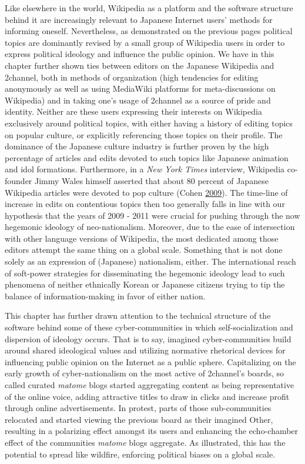 \documentclass[10pt,british,A4paper,twoside]{memoir}
\begin{document}
Like elsewhere in the world, Wikipedia as a platform and the software
structure behind it are increasingly relevant to Japanese Internet
users' methods for informing oneself. Nevertheless, as demonstrated on
the previous pages political topics are dominantly revised by a small
group of Wikipedia users in order to express political ideology and
influence the public opinion. We have in this chapter further shown ties
between editors on the Japanese Wikipedia and 2channel, both in methods
of organization (high tendencies for editing anonymously as well as
using MediaWiki platforms for meta-discussions on Wikipedia) and in
taking one's usage of 2channel as a source of pride and identity.
Neither are these users expressing their interests on Wikipedia
exclusively around political topics, with either having a history
of editing topics on popular culture, or explicitly referencing those
topics on their profile. The dominance of the Japanese culture industry
is further proven by the high percentage of articles and edits devoted
to such topics like Japanese animation and idol formations. Furthermore,
in a \emph{New York Times} interview, Wikipedia co-founder Jimmy Wales
himself asserted that about 80 percent of Japanese Wikipedia articles
were devoted to pop culture (Cohen
\protect\hyperlink{ref-cohen_wikipedia_2009}{2009}). The time-line of
increase in edits on contentious topics then too generally falls in line
with our hypothesis that the years of 2009 - 2011 were crucial for pushing through the now hegemonic ideology of neo-nationalism. Moreover, due to the
ease of intersection with other language versions of Wikipedia, the most
dedicated among those editors attempt the same thing on a global scale.
Something that is not done solely as an expression of (Japanese)
nationalism, either. The international reach of soft-power strategies
for disseminating the hegemonic ideology lead to such phenomena of
neither ethnically Korean or Japanese citizens trying to tip the balance
of information-making in favor of either nation.

This chapter has
further drawn attention to the technical structure of the software
behind some of these cyber-communities in which self-socialization and
dispersion of ideology occurs. That is to say, imagined
cyber-communities build around shared ideological values and utilizing
normative rhetorical devices for influencing public opinion on the
Internet as a public sphere. Capitalizing on the early growth of
cyber-nationalism on the most active of 2channel's boards, so called
curated \emph{matome} blogs started aggregating content as being
representative of the online voice, adding attractive titles to draw in
clicks and increase profit through online advertisements. In protest,
parts of those sub-communities relocated and started viewing the
previous board as their imagined Other, resulting in a polarizing effect
amongst its users and enhancing the echo-chamber effect of the
communities \emph{matome} blogs aggregate. As illustrated, this has the
potential to spread like wildfire, enforcing political biases on a
global scale.
\end{document}
